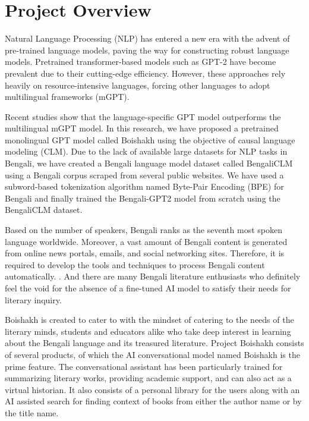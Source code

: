 \section{Project Overview}
\sloppy
Natural Language Processing (NLP) has entered a new era with the advent of pre-trained language models, paving the way for constructing robust language models. Pretrained transformer-based models such as GPT-2 have become prevalent due to their cutting-edge efficiency. However, these approaches rely heavily on resource-intensive languages, forcing other languages to adopt multilingual frameworks (mGPT).

Recent studies show that the language-specific GPT model outperforms the multilingual mGPT model. In this research, we have proposed a pretrained monolingual GPT model called Boishakh using the objective of causal language modeling (CLM). Due to the lack of available large datasets for NLP tasks in Bengali, we have created a Bengali language model dataset called BengaliCLM using a Bengali corpus scraped from several public websites. We have used a subword-based tokenization algorithm named Byte-Pair Encoding (BPE) for Bengali and finally trained the Bengali-GPT2 model from scratch using the BengaliCLM dataset.

Based on the number of speakers, Bengali ranks as the seventh most spoken language worldwide. Moreover, a vast amount of Bengali content is generated from online news portals, emails, and social networking sites. Therefore, it is required to develop the tools and techniques to process Bengali content automatically. . And there are many Bengali literature enthusiasts who definitely feel the void for the absence of a fine-tuned AI model to satisfy their needs for literary inquiry.

Boishakh is created to cater to with the mindset of catering to the needs of the literary minds, students and educators alike who take deep interest in learning about the Bengali language and its treasured literature. Project Boishakh consists of several products, of which the AI conversational model named Boishakh is the prime feature. The conversational assistant has been particularly trained for summarizing literary works, providing academic support, and can also act as a virtual historian. It also consists of a personal library for the users along with an AI assisted search for finding context of books from either the author name or by the title name.

